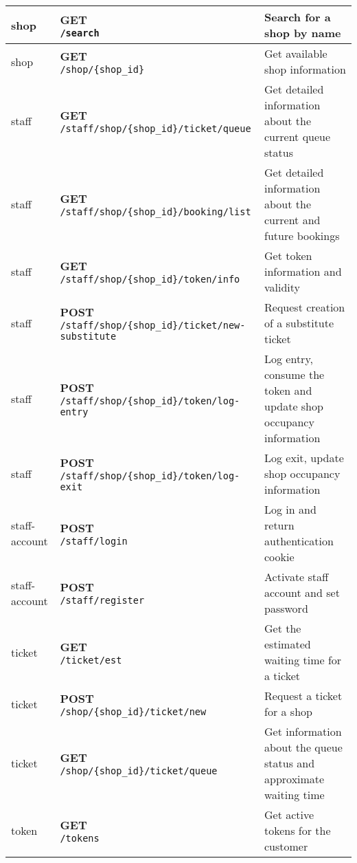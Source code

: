 \begin{tabularx}{\textwidth}{|p{}|l|X|}
shop & \makecell{\textbf{GET} \\ \texttt{/search}}  & Search for a shop by name \\\hline
shop & \makecell{\textbf{GET} \\ \texttt{/shop/\{shop\_id\}}}  & Get available shop information \\\hline
staff & \makecell{\textbf{GET} \\ \texttt{/staff/shop/\{shop\_id\}/ticket/queue}}  & Get detailed information about the current queue status \\\hline
staff & \makecell{\textbf{GET} \\ \texttt{/staff/shop/\{shop\_id\}/booking/list}}  & Get detailed information about the current and future bookings \\\hline
staff & \makecell{\textbf{GET} \\ \texttt{/staff/shop/\{shop\_id\}/token/info}}  & Get token information and validity \\\hline
staff & \makecell{\textbf{POST} \\ \texttt{/staff/shop/\{shop\_id\}/ticket/new-substitute}}  & Request creation of a substitute ticket \\\hline
staff & \makecell{\textbf{POST} \\ \texttt{/staff/shop/\{shop\_id\}/token/log-entry}}  & Log entry, consume the token and update shop occupancy information \\\hline
staff & \makecell{\textbf{POST} \\ \texttt{/staff/shop/\{shop\_id\}/token/log-exit}}  & Log exit, update shop occupancy information \\\hline
staff-account & \makecell{\textbf{POST} \\ \texttt{/staff/login}}  & Log in and return authentication cookie \\\hline
staff-account & \makecell{\textbf{POST} \\ \texttt{/staff/register}}  & Activate staff account and set password \\\hline
ticket & \makecell{\textbf{GET} \\ \texttt{/ticket/est}}  & Get the estimated waiting time for a ticket \\\hline
ticket & \makecell{\textbf{POST} \\ \texttt{/shop/\{shop\_id\}/ticket/new}}  & Request a ticket for a shop \\\hline
ticket & \makecell{\textbf{GET} \\ \texttt{/shop/\{shop\_id\}/ticket/queue}}  & Get information about the queue status and approximate waiting time \\\hline
token & \makecell{\textbf{GET} \\ \texttt{/tokens}}  & Get active tokens for the customer \\\hline
\end{tabularx}

